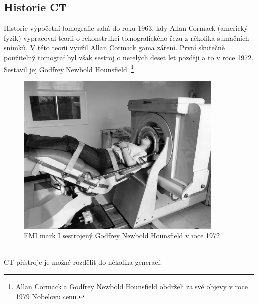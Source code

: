 \documentclass{thesis}%
\begin{document}
\subsection{Historie CT}
Historie výpočetní tomografie sahá do roku 1963, kdy Allan Cormack (americký fyzik) vypracoval teorii o rekonstrukci tomografického řezu z několika sumačních snímků. V této teorii využil Allan Cormack gama záření. První skutečně použitelný tomograf byl však sestroj o necelých deset let později a to v roce 1972. Sestavil jej Godfrey Newbold Hounsfield. \footnote[2]{Allan Cormack a  Godfrey Newbold Hounsfield obdrželi za své objevy v roce 1979 Nobelovu cenu.} \\
\begin{figure}[h]
 \centering
	\includegraphics[width=10cm]{EMI_CT.png}
	\caption[EMI mark I]{EMI mark I sestrojený Godfrey Newbold Hounsfield v roce 1972}
\end{figure}
\null\\
CT přístroje je možné rozdělit do několika generací:
\end{document}
